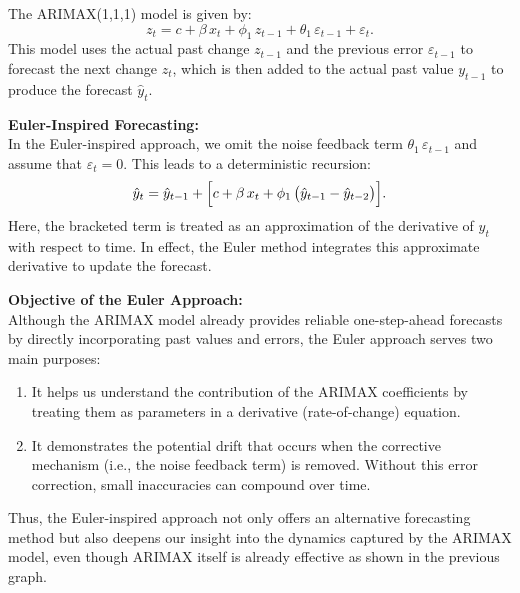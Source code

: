 \documentclass[10pt]{article}
\begin{document}
The ARIMAX(1,1,1) model is given by:
\[
z_t = c + \beta\,x_t + \phi_1\,z_{t-1} + \theta_1\,\varepsilon_{t-1} + \varepsilon_t.
\]
This model uses the actual past change \(z_{t-1}\) and the previous error \(\varepsilon_{t-1}\) to forecast the next change \(z_t\), which is then added to the actual past value \(y_{t-1}\) to produce the forecast \(\hat{y}_t\).

\textbf{Euler-Inspired Forecasting:}\\[1mm]
In the Euler-inspired approach, we omit the noise feedback term \(\theta_1\,\varepsilon_{t-1}\) and assume that \(\varepsilon_t = 0\). This leads to a deterministic recursion:
\[
\hat{y}_t = \hat{y}_{t-1} + \Bigl[c + \beta\,x_t + \phi_1\,\bigl(\hat{y}_{t-1} - \hat{y}_{t-2}\bigr)\Bigr].
\]
Here, the bracketed term is treated as an approximation of the derivative of \(y_t\) with respect to time. In effect, the Euler method integrates this approximate derivative to update the forecast.

\textbf{Objective of the Euler Approach:}\\[1mm]
Although the ARIMAX model already provides reliable one-step-ahead forecasts by directly incorporating past values and errors, the Euler approach serves two main purposes:
\begin{enumerate}
    \item It helps us understand the contribution of the ARIMAX coefficients by treating them as parameters in a derivative (rate-of-change) equation.
    \item It demonstrates the potential drift that occurs when the corrective mechanism (i.e., the noise feedback term) is removed. Without this error correction, small inaccuracies can compound over time.
\end{enumerate}
Thus, the Euler-inspired approach not only offers an alternative forecasting method but also deepens our insight into the dynamics captured by the ARIMAX model, even though ARIMAX itself is already effective as shown in the previous graph.
\end{document}
